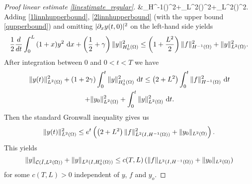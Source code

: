 \begin{proof}[Proof linear estimate \eqref{linestimate_regular}]
  &\leq {}_{H^{-1}(\Omega)}^{2}+_{L^{2}(\Omega)}^{2}+_{L^{2}(\Omega)}^{2}.
  \eeal
  Adding \eqref{1linnhupperbound}, \eqref{2linnhupperbound} (with the upper bound \eqref{qupperbound}) and omitting $\lvert\partial_{x} y(t,0)\rvert^{2}$ on the left-hand side yields
  \[
  \frac{1}{2}\frac{d}{dt}\int_{0}^{L}{(1+x)y^{2}~\mathrm dx} +\left(\frac{1}{2}+\gamma\right)\|y\|_{H^1_0(\Omega)}^2\leq \left(1 +\frac{L^{2}}{2}\right)\lVert f\rVert_{H^{-1}(\Omega)}^{2} + \|y\|_{L^2(\Omega)}^2.
  \]
  After integration between $0$ and $0<t<T$ we have
  \begin{multline*}
  \|y(t)\|_{L^2(\Omega)}^2+ \left( 1+2\gamma \right)\int_{0}^{t}{\|y\|_{H^1_0(\Omega)}^2~\mathrm dt}\leq \left(2+L^{2}\right)\int_{0}^{t}{\lVert f\rVert_{H^{-1}(\Omega)}^{2}~\mathrm dt}\\
  +\|y_{0}\|_{L^2(\Omega)}^2+\int_0^t{\|y\|_{L^2(\Omega)}^2~\mathrm dt}.
  \end{multline*}
  Then the standard Gronwall inequality gives us
  \[
  \|y(t)\|_{L^2(\Omega)}^2  \leq e^t\left(\left(2+L^{2}\right)\lVert f\rVert_{L^{2}(I,H^{-1}(\Omega))}^{2}+\lVert y_{0}\rVert_{L^{2}(\Omega)}\right).
  \]
  This yields
  \[
  \|y\|_{\mathcal C(\bar I,L^2(\Omega))}+\|y\|_{L^2(I,H^1_0(\Omega))}\leq c(T,L)\,(\|f\|_{\Hm1}+\|y_0\|_{L^2(\Omega)})
  \]
  for some $c(T,L)>0$ independent of $y$, $f$ and $y_o$.
\qquad\end{proof}

